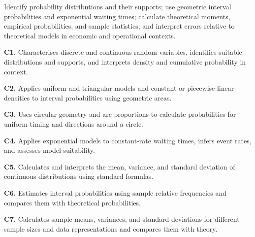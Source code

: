 \LearningObjective
{Identify probability distributions and their supports; use geometric interval probabilities and exponential waiting times; calculate theoretical moments, empirical probabilities, and sample statistics; and interpret errors relative to theoretical models in economic and operational contexts.}
{	\footnotesize
	\textbf{C1.} Characterises discrete and continuous random variables, identifies suitable distributions and supports, and interprets density and cumulative probability in context.\par
	\textbf{C2.} Applies uniform and triangular models and constant or piecewise-linear densities to interval probabilities using geometric areas.\par
	\textbf{C3.} Uses circular geometry and arc proportions to calculate probabilities for uniform timing and directions around a circle.\par
	\textbf{C4.} Applies exponential models to constant-rate waiting times, infers event rates, and assesses model suitability.\par
	\textbf{C5.} Calculates and interprets the mean, variance, and standard deviation of continuous distributions using standard formulas.\par
	\textbf{C6.} Estimates interval probabilities using sample relative frequencies and compares them with theoretical probabilities.\par
	\textbf{C7.} Calculates sample means, variances, and standard deviations for different sample sizes and data representations and compares them with theory.
}

\StudentInfo \vspace{-3mm}


